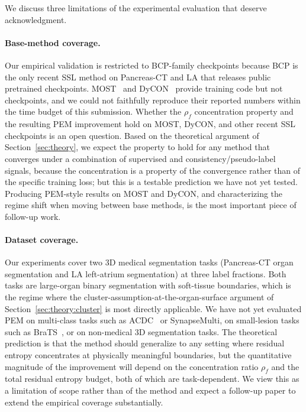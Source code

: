 We discuss three limitations of the experimental evaluation that deserve acknowledgment.

\paragraph{Base-method coverage.}
Our empirical validation is restricted to BCP-family checkpoints because BCP is the only recent SSL method on Pancreas-CT and LA that releases public pretrained checkpoints. MOST~\cite{liu2024most} and DyCON~\cite{assefa2025dycon} provide training code but not checkpoints, and we could not faithfully reproduce their reported numbers within the time budget of this submission. Whether the $\rho_f$ concentration property and the resulting PEM improvement hold on MOST, DyCON, and other recent SSL checkpoints is an open question. Based on the theoretical argument of Section~\ref{sec:theory}, we expect the property to hold for any method that converges under a combination of supervised and consistency/pseudo-label signals, because the concentration is a property of the convergence rather than of the specific training loss; but this is a testable prediction we have not yet tested. Producing PEM-style results on MOST and DyCON, and characterizing the regime shift when moving between base methods, is the most important piece of follow-up work.

\paragraph{Dataset coverage.}
Our experiments cover two 3D medical segmentation tasks (Pancreas-CT organ segmentation and LA left-atrium segmentation) at three label fractions. Both tasks are large-organ binary segmentation with soft-tissue boundaries, which is the regime where the cluster-assumption-at-the-organ-surface argument of Section~\ref{sec:theory:cluster} is most directly applicable. We have not yet evaluated PEM on multi-class tasks such as ACDC~\cite{bernard2018acdc} or SynapseMulti, on small-lesion tasks such as BraTS~\cite{baid2021brats}, or on non-medical 3D segmentation tasks. The theoretical prediction is that the method should generalize to any setting where residual entropy concentrates at physically meaningful boundaries, but the quantitative magnitude of the improvement will depend on the concentration ratio $\rho_f$ and the total residual entropy budget, both of which are task-dependent. We view this as a limitation of scope rather than of the method and expect a follow-up paper to extend the empirical coverage substantially.

